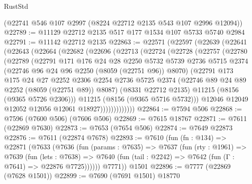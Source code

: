 \begin{lexlean}{RustStd}
\begin{coremodule}
    (@22741 @546 @107 @2997 (@8224 @22712 @2135 @543 @107 @2996 @12094))
@22789 := @11129 @22712 @2135 @517 @177 @1534 @107 @5733 @5740 @2984
@22791 := @11142 @22712 @2135
@22863 := @22571
    (@22597
      (@22639
        (@22641
          (@22643
            (@22664
              (@22682
                (@22696
                  (@22713
                    (@22724
                      (@22728
                        (@22757
                          (@22780
                            (@22789
                              (@22791
                                @171
                                @176
                                @24
                                @28
                                @2250
                                @5732
                                @5739
                                @2736
                                @5715
                                @2374
                                (@22746 @96 @24 @96 @2250 (@8059 (@22751 @96)) @8070)
                                (@22791
                                  @173
                                  @175
                                  @24
                                  @27
                                  @2252
                                  @2306
                                  @2254
                                  @2736
                                  @5725
                                  @2374
                                  (@22746 @89 @24 @89 @2252 (@8059 (@22751 @89)) @8087)
                                  (@8331 @22712 @2135)
                                  @11215
                                  (@8156 (@9365 @5726 @2306)))
                                @11215
                                (@8156 (@9365 @5716 @5732)))
                              @12046
                              @12049
                              @12052
                              @12056
                              @12061
                              @18927)))))))))))))
@22864 := @7594 @506
@22868 := @7596 (@7600 @506) (@7606 @506)
@22869 := @7615 @18767
@22871 := @7611 (@22869 @7630)
@22873 := @7653 (@7654 @506)
@22874 := @7649 @22873
@22876 := @7611 (@22874 @7678)
@22893 := @7610
    (fun (fn : @134) =>
    @22871
      (@7633
        (@7636
          (fun (params : @7635) =>
          @7637
            (fun (rty : @1961) =>
            @7639
              (fun (lets : @7638) =>
              @7640 (fun (tail : @2242) => @7642 (fun (Γ : @7641) => @22876 @7725))))))
        @7771))
    @1501
@22896 := @7777 (@22869 (@7628 @1501))
@22899 := @7690 (@7691 @1501) @18770

\end{coremodule}
\end{lexlean}
